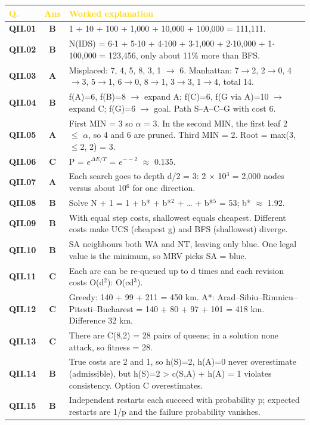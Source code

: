 \documentclass[11pt]{article}
\begin{document}
\begin{longtable}{>{\leavevmode\bfseries\color{navy}}p{1.3cm} c p{13.2cm}}
\rowcolor{navy}\textcolor{gold}{\textbf{Q.}}&\textcolor{gold}{\textbf{Ans}}&\textcolor{gold}{\textbf{Worked explanation}}\\\endhead
QII.01&\textbf{\color{leaf}B}&1 + 10 + 100 + 1,000 + 10,000 + 100,000 = 111,111.\\
\rowcolor{ivory}QII.02&\textbf{\color{leaf}B}&N(IDS) = 6$\cdot$1 + 5$\cdot$10 + 4$\cdot$100 + 3$\cdot$1,000 + 2$\cdot$10,000 + 1$\cdot$100,000 = 123,456, only about 11\% more than BFS.\\
QII.03&\textbf{\color{leaf}A}&Misplaced: 7, 4, 5, 8, 3, 1 $\to$ 6. Manhattan: 7$\to$2, 2$\to$0, 4$\to$3, 5$\to$1, 6$\to$0, 8$\to$1, 3$\to$3, 1$\to$4, total 14.\\
\rowcolor{ivory}QII.04&\textbf{\color{leaf}B}&f(A)=6, f(B)=8 $\to$ expand A; f(C)=6, f(G via A)=10 $\to$ expand C; f(G)=6 $\to$ goal. Path S--A--C--G with cost 6.\\
QII.05&\textbf{\color{leaf}A}&First MIN = 3 so $\alpha$ = 3. In the second MIN, the first leaf 2 $\le$ $\alpha$, so 4 and 6 are pruned. Third MIN = 2. Root = max(3, $\le$2, 2) = 3.\\
\rowcolor{ivory}QII.06&\textbf{\color{leaf}C}&P = $e^{\Delta E/T}$ = $e^{--2}$ $\approx$ 0.135.\\
QII.07&\textbf{\color{leaf}A}&Each search goes to depth d/2 = 3: 2 $\times$ 10$^3$ = 2,000 nodes versus about 10$^6$ for one direction.\\
\rowcolor{ivory}QII.08&\textbf{\color{leaf}B}&Solve N + 1 = 1 + b* + b*$^2$ + \dots{} + b*$^5$ = 53; b* $\approx$ 1.92.\\
QII.09&\textbf{\color{leaf}B}&With equal step costs, shallowest equals cheapest. Different costs make UCS (cheapest g) and BFS (shallowest) diverge.\\
\rowcolor{ivory}QII.10&\textbf{\color{leaf}B}&SA neighbours both WA and NT, leaving only blue. One legal value is the minimum, so MRV picks SA = blue.\\
QII.11&\textbf{\color{leaf}C}&Each arc can be re-queued up to d times and each revision costs O(d$^2$): O(cd$^3$).\\
\rowcolor{ivory}QII.12&\textbf{\color{leaf}C}&Greedy: 140 + 99 + 211 = 450 km. A*: Arad--Sibiu--Rimnicu--Pitesti--Bucharest = 140 + 80 + 97 + 101 = 418 km. Difference 32 km.\\
QII.13&\textbf{\color{leaf}C}&There are C(8,2) = 28 pairs of queens; in a solution none attack, so fitness = 28.\\
\rowcolor{ivory}QII.14&\textbf{\color{leaf}B}&True costs are 2 and 1, so h(S)=2, h(A)=0 never overestimate (admissible), but h(S)=2 > c(S,A) + h(A) = 1 violates consistency. Option C overestimates.\\
QII.15&\textbf{\color{leaf}B}&Independent restarts each succeed with probability p; expected restarts are 1/p and the failure probability vanishes.\\
\end{longtable}
\end{document}
